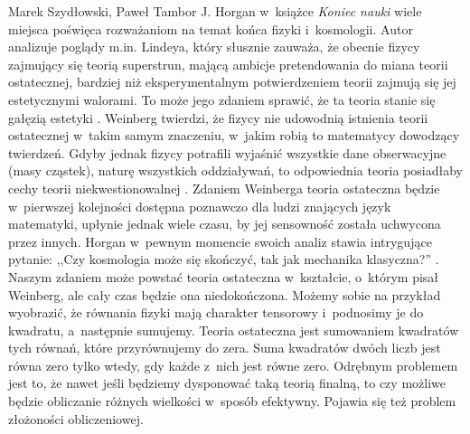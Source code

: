 \begin{artplenv2auth}{Marek Szydłowski, Paweł Tambor}
J. Horgan w~książce \textit{Koniec nauki}
\parencite*[][]{horgan_koniec_1999} %
 wiele miejsca poświęca rozważaniom na temat końca fizyki i~kosmologii. Autor analizuje poglądy m.in. Lindeya, który słusznie zauważa, że obecnie fizycy zajmujący się teorią superstrun, mającą ambicje pretendowania do miana teorii ostatecznej, bardziej niż eksperymentalnym potwierdzeniem teorii zajmują się jej estetycznymi walorami. To może jego zdaniem sprawić, że ta teoria stanie się gałęzią estetyki 
\parencite[][s.~94]{horgan_koniec_1999}. %
 Weinberg twierdzi, że fizycy nie udowodnią istnienia teorii ostatecznej w~takim samym znaczeniu, w~jakim robią to matematycy dowodzący twierdzeń. Gdyby jednak fizycy potrafili wyjaśnić wszystkie dane obserwacyjne (masy cząstek), naturę wszystkich oddziaływań, to odpowiednia teoria posiadłaby cechy teorii niekwestionowalnej 
\parencite[][s.~99]{horgan_koniec_1999}. %
 Zdaniem Weinberga teoria ostateczna będzie w~pierwszej kolejności dostępna poznawczo dla ludzi znających język matematyki, upłynie jednak wiele czasu, by jej sensowność została uchwycona przez innych. Horgan w~pewnym momencie swoich analiz stawia intrygujące pytanie: ,,Czy kosmologia może się skończyć, tak jak mechanika klasyczna?'' 
\parencite[][s.~134]{horgan_koniec_1999}. %
 Naszym zdaniem może powstać teoria ostateczna w~kształcie, o~którym pisał Weinberg, ale cały czas będzie ona niedokończona. Możemy sobie na przykład wyobrazić, że równania fizyki mają charakter tensorowy i~podnosimy je do kwadratu, a~następnie sumujemy. Teoria ostateczna jest sumowaniem kwadratów tych równań, które przyrównujemy do zera. Suma kwadratów dwóch liczb jest równa zero tylko wtedy, gdy każde z~nich jest równe zero. Odrębnym problemem jest to, że nawet jeśli będziemy dysponować taką teorią finalną, to czy możliwe będzie obliczanie różnych wielkości w~sposób efektywny. Pojawia się też problem złożoności obliczeniowej.


\end{artplenv2auth}